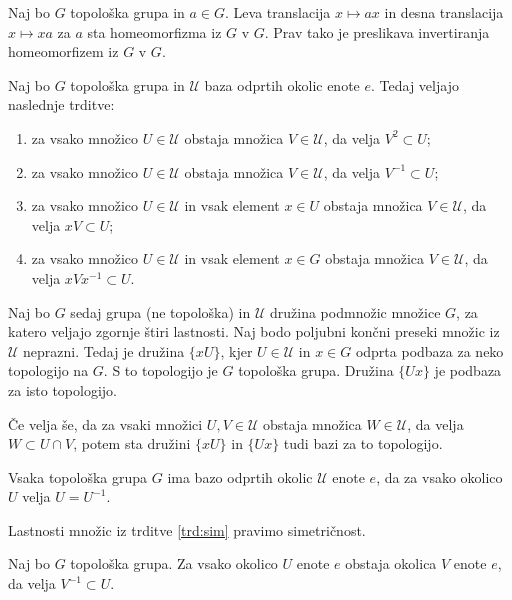 \documentclass[mat1]{fmfdelo}
\newcommand{\Ucurl}{\mathcal{U}}
\begin{document}
\begin{trditev}\label{trd:trans}
Naj bo $G$ topološka grupa in $a \in G$. Leva translacija $x \mapsto ax$ in desna translacija $x \mapsto xa$ za $a$ sta homeomorfizma iz $G$ v $G$. Prav tako je preslikava invertiranja homeomorfizem iz $G$ v $G$.
\end{trditev}

\begin{trditev}\label{trd:okolice}
Naj bo $G$ topološka grupa in $\Ucurl$ baza odprtih okolic enote $e$. Tedaj veljajo naslednje trditve:
\begin{enumerate}
\item za vsako množico $U \in \Ucurl$ obstaja množica $V \in \Ucurl$, da velja $V^{2} \subset U$;
\item za vsako množico $U \in \Ucurl$ obstaja množica $V \in \Ucurl$, da velja $V^{-1} \subset U$;
\item za vsako množico $U \in \Ucurl$ in vsak element $x \in U$ obstaja množica $V \in \Ucurl$, da velja $xV \subset U$;
\item za vsako množico $U \in \Ucurl$ in vsak element $x \in G$ obstaja množica $V \in \Ucurl$, da velja $xVx^{-1} \subset U$.
\end{enumerate}

Naj bo $G$ sedaj grupa (ne topološka) in $\Ucurl$ družina podmnožic množice $G$, za katero veljajo zgornje štiri lastnosti. Naj bodo poljubni končni preseki množic iz $\Ucurl$ neprazni. Tedaj je družina $\lbrace xU \rbrace$, kjer $U \in \Ucurl$ in $x \in G$ odprta podbaza za neko topologijo na $G$. S to topologijo je $G$ topološka grupa. Družina $\lbrace Ux \rbrace$ je podbaza za isto topologijo.

Če velja še, da za vsaki množici $U,V \in \Ucurl$ obstaja množica $W \in \Ucurl$, da velja $W \subset U \cap V$, potem sta družini $\lbrace xU \rbrace$ in $\lbrace Ux \rbrace$ tudi bazi za to topologijo.
\end{trditev}

\begin{trditev}\label{trd:sim}
Vsaka topološka grupa $G$ ima bazo odprtih okolic $\Ucurl$ enote $e$, da za vsako okolico $U$ velja $U = U^{-1}$.
\end{trditev}

\begin{opomba}
Lastnosti množic iz trditve \ref{trd:sim} pravimo simetričnost.
\end{opomba}

\begin{posledica}\label{pos:sim}
Naj bo $G$ topološka grupa. Za vsako okolico $U$ enote $e$ obstaja okolica $V$ enote $e$, da velja $V^{-1} \subset U$.
\end{posledica}
\end{document}
